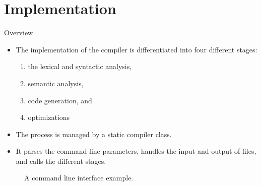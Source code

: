 \section{Implementation}
\begin{frame}{Overview}
    \begin{itemize}
        \item The implementation of the compiler is differentiated into four different stages:
        \begin{enumerate}
            \item the lexical and syntactic analysis,
            \item semantic analysis,
            \item code generation, and %
            \item optimizations
        \end{enumerate}
        \item The process is managed by a static compiler class.
        \item It parses the command line parameters, handles the input and output of files, and calls the different stages.
    \end{itemize}    
    \begin{figure}[htp]
        \centering     
        
        \caption{A command line interface example.}
    \end{figure}
\end{frame}

